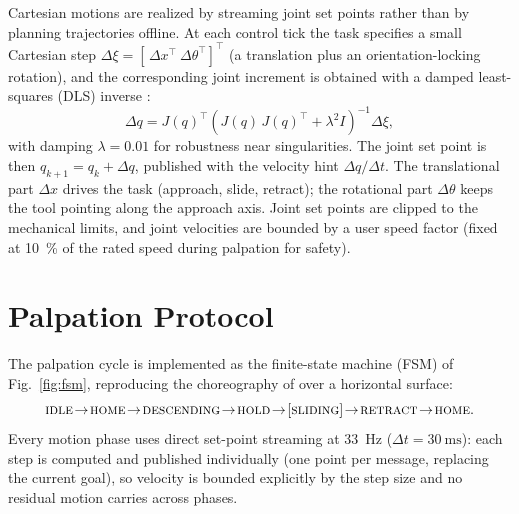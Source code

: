 \documentclass[conference]{IEEEtran}
\begin{document}
Cartesian motions are realized by streaming joint set points rather than by
planning trajectories offline. At each control tick the task specifies a small
Cartesian step $\Delta\xi=[\,\Delta x^\top\ \Delta\theta^\top]^\top$ (a
translation plus an orientation-locking rotation), and the corresponding joint
increment is obtained with a damped least-squares (DLS) inverse
\cite{nakamura1986,siciliano2009}:
\begin{equation}
\Delta q = J(q)^\top\!\left(J(q)\, J(q)^\top + \lambda^2 I\right)^{-1}\Delta\xi,
\label{eq:dls}
\end{equation}
with damping $\lambda=0.01$ for robustness near singularities. The joint set point
is then $q_{k+1}=q_k+\Delta q$, published with the velocity hint $\Delta q/\Delta
t$. The translational part $\Delta x$ drives the task (approach, slide, retract);
the rotational part $\Delta\theta$ keeps the tool pointing along the approach
axis. Joint set points are clipped to the mechanical limits, and joint velocities
are bounded by a user speed factor (fixed at \SI{10}{\percent} of the rated speed
during palpation for safety).

\section{Palpation Protocol}
\label{sec:fsm}
The palpation cycle is implemented as the finite-state machine (FSM) of
Fig.~\ref{fig:fsm}, reproducing the choreography of \cite{gupta2021} over a
horizontal surface:
\begin{equation*}
\textsc{idle}\!\rightarrow\!\textsc{home}\!\rightarrow\!\textsc{descending}
\!\rightarrow\!\textsc{hold}\!\rightarrow\![\textsc{sliding}]\!\rightarrow\!
\textsc{retract}\!\rightarrow\!\textsc{home}.
\end{equation*}
Every motion phase uses direct set-point streaming at \SI{33}{\hertz}
($\Delta t=\SI{30}{\milli\second}$): each step is computed and published
individually (one point per message, replacing the current goal), so velocity is
bounded explicitly by the step size and no residual motion carries across
phases.
\end{document}
